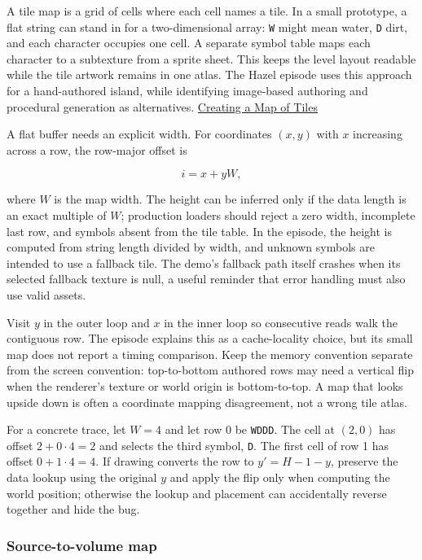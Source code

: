 A tile map is a grid of cells where each cell names a tile. In a small prototype, a flat string can stand in for a two-dimensional array: \texttt{W} might mean water, \texttt{D} dirt, and each character occupies one cell. A separate symbol table maps each character to a subtexture from a sprite sheet. This keeps the level layout readable while the tile artwork remains in one atlas. The Hazel episode uses this approach for a hand-authored island, while identifying image-based authoring and procedural generation as alternatives. \href{https://www.youtube.com/watch?v=mj7qCwHTtK8}{Creating a Map of Tiles}

A flat buffer needs an explicit width. For coordinates \((x,y)\) with \(x\) increasing across a row, the row-major offset is

\[
 i = x + yW,
\]

where \(W\) is the map width. The height can be inferred only if the data length is an exact multiple of \(W\); production loaders should reject a zero width, incomplete last row, and symbols absent from the tile table. In the episode, the height is computed from string length divided by width, and unknown symbols are intended to use a fallback tile. The demo's fallback path itself crashes when its selected fallback texture is null, a useful reminder that error handling must also use valid assets.

Visit \(y\) in the outer loop and \(x\) in the inner loop so consecutive reads walk the contiguous row. The episode explains this as a cache-locality choice, but its small map does not report a timing comparison. Keep the memory convention separate from the screen convention: top-to-bottom authored rows may need a vertical flip when the renderer's texture or world origin is bottom-to-top. A map that looks upside down is often a coordinate mapping disagreement, not a wrong tile atlas.

For a concrete trace, let \(W=4\) and let row 0 be \texttt{WDDD}. The cell at \((2,0)\) has offset \(2+0\cdot4=2\) and selects the third symbol, \texttt{D}. The first cell of row 1 has offset \(0+1\cdot4=4\). If drawing converts the row to \(y'=H-1-y\), preserve the data lookup using the original \(y\) and apply the flip only when computing the world position; otherwise the lookup and placement can accidentally reverse together and hide the bug.

\subsubsection{Source-to-volume map}\label{06-engine-ii-ch026-source-to-volume-map-2}

